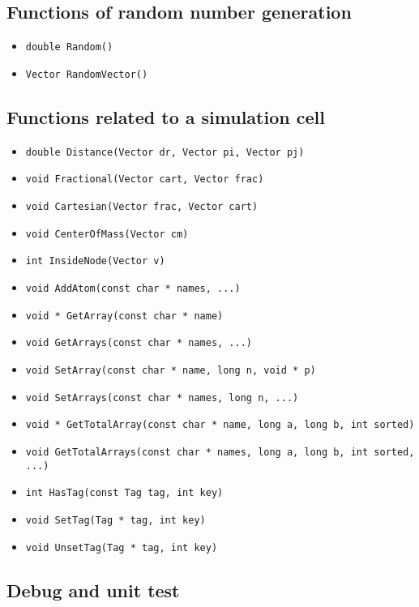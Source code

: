 \documentclass[a4paper,12pt]{article}
\begin{document}
\subsection{Functions of random number generation}

\begin{itemize}
\item \verb'double Random()'
\item \verb'Vector RandomVector()'
\end{itemize}

\subsection{Functions related to a simulation cell}

\begin{itemize}
\item \verb'double Distance(Vector dr, Vector pi, Vector pj)'
\item \verb'void Fractional(Vector cart, Vector frac)'
\item \verb'void Cartesian(Vector frac, Vector cart)'
\item \verb'void CenterOfMass(Vector cm)'
\item \verb'int InsideNode(Vector v)'
\item \verb'void AddAtom(const char * names, ...)'
\item \verb'void * GetArray(const char * name)'
\item \verb'void GetArrays(const char * names, ...)'
\item \verb'void SetArray(const char * name, long n, void * p)'
\item \verb'void SetArrays(const char * names, long n, ...)'
\item \verb'void * GetTotalArray(const char * name, long a, long b, int sorted)'
\item \verb'void GetTotalArrays(const char * names, long a, long b, int sorted, ...)'
\item \verb'int HasTag(const Tag tag, int key)'
\item \verb'void SetTag(Tag * tag, int key)'
\item \verb'void UnsetTag(Tag * tag, int key)'
\end{itemize}

\subsection{Debug and unit test}
\end{document}
